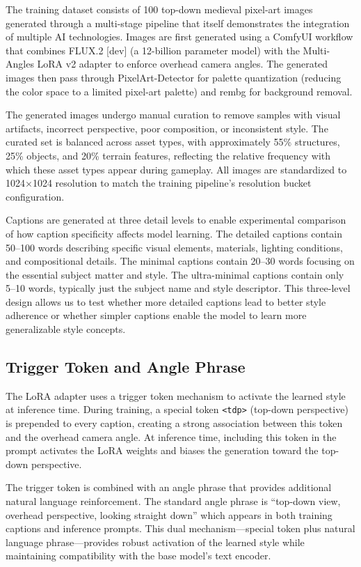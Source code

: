 \documentclass[conference]{IEEEtran}
\begin{document}
The training dataset consists of 100 top-down medieval pixel-art images generated through a multi-stage pipeline that itself demonstrates the integration of multiple AI technologies. Images are first generated using a ComfyUI workflow that combines FLUX.2 [dev] (a 12-billion parameter model) with the Multi-Angles LoRA v2 adapter to enforce overhead camera angles. The generated images then pass through PixelArt-Detector for palette quantization (reducing the color space to a limited pixel-art palette) and rembg for background removal.

The generated images undergo manual curation to remove samples with visual artifacts, incorrect perspective, poor composition, or inconsistent style. The curated set is balanced across asset types, with approximately 55\% structures, 25\% objects, and 20\% terrain features, reflecting the relative frequency with which these asset types appear during gameplay. All images are standardized to 1024$\times$1024 resolution to match the training pipeline's resolution bucket configuration.

Captions are generated at three detail levels to enable experimental comparison of how caption specificity affects model learning. The detailed captions contain 50--100 words describing specific visual elements, materials, lighting conditions, and compositional details. The minimal captions contain 20--30 words focusing on the essential subject matter and style. The ultra-minimal captions contain only 5--10 words, typically just the subject name and style descriptor. This three-level design allows us to test whether more detailed captions lead to better style adherence or whether simpler captions enable the model to learn more generalizable style concepts.

\subsection{Trigger Token and Angle Phrase}

The LoRA adapter uses a trigger token mechanism to activate the learned style at inference time. During training, a special token \texttt{<tdp>} (top-down perspective) is prepended to every caption, creating a strong association between this token and the overhead camera angle. At inference time, including this token in the prompt activates the LoRA weights and biases the generation toward the top-down perspective.

The trigger token is combined with an angle phrase that provides additional natural language reinforcement. The standard angle phrase is ``top-down view, overhead perspective, looking straight down'' which appears in both training captions and inference prompts. This dual mechanism---special token plus natural language phrase---provides robust activation of the learned style while maintaining compatibility with the base model's text encoder.
\end{document}
